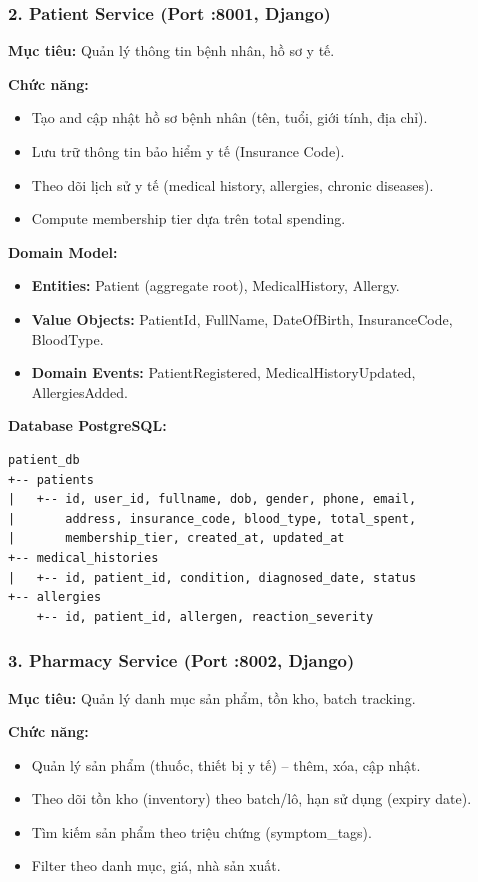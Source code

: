 \documentclass[12pt,a4paper]{article}
\begin{document}
\subsubsection{2. Patient Service (Port :8001, Django)}

\textbf{Mục tiêu:} Quản lý thông tin bệnh nhân, hồ sơ y tế.

\textbf{Chức năng:}
\begin{itemize}
    \item Tạo and cập nhật hồ sơ bệnh nhân (tên, tuổi, giới tính, địa chỉ).
    \item Lưu trữ thông tin bảo hiểm y tế (Insurance Code).
    \item Theo dõi lịch sử y tế (medical history, allergies, chronic diseases).
    \item Compute membership tier dựa trên total spending.
\end{itemize}

\textbf{Domain Model:}
\begin{itemize}
    \item \textbf{Entities:} Patient (aggregate root), MedicalHistory, Allergy.
    \item \textbf{Value Objects:} PatientId, FullName, DateOfBirth, InsuranceCode, BloodType.
    \item \textbf{Domain Events:} PatientRegistered, MedicalHistoryUpdated, AllergiesAdded.
\end{itemize}

\textbf{Database PostgreSQL:}
\begin{verbatim}
patient_db
+-- patients
|   +-- id, user_id, fullname, dob, gender, phone, email,
|       address, insurance_code, blood_type, total_spent,
|       membership_tier, created_at, updated_at
+-- medical_histories
|   +-- id, patient_id, condition, diagnosed_date, status
+-- allergies
    +-- id, patient_id, allergen, reaction_severity
\end{verbatim}

\subsubsection{3. Pharmacy Service (Port :8002, Django)}

\textbf{Mục tiêu:} Quản lý danh mục sản phẩm, tồn kho, batch tracking.

\textbf{Chức năng:}
\begin{itemize}
    \item Quản lý sản phẩm (thuốc, thiết bị y tế) – thêm, xóa, cập nhật.
    \item Theo dõi tồn kho (inventory) theo batch/lô, hạn sử dụng (expiry date).
    \item Tìm kiếm sản phẩm theo triệu chứng (symptom\_tags).
    \item Filter theo danh mục, giá, nhà sản xuất.
\end{itemize}
\end{document}
